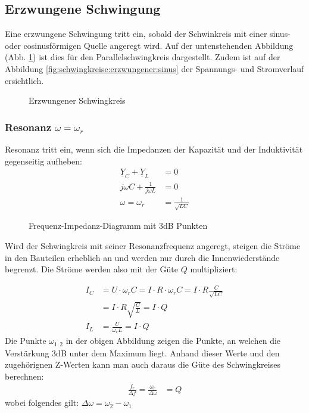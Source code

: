 \subsection{Erzwungene Schwingung}

Eine erzwungene Schwingung tritt ein, sobald der Schwinkreis mit einer sinus-
oder cosinusförmigen Quelle angeregt wird. Auf der untenstehenden Abbildung
(Abb. \ref{fig:schwingkreise:erzwungene}) ist dies für den Parallelschwingkreis
dargestellt. Zudem ist auf der Abbildung
\ref{fig:schwingkreise:erzwungener:sinus} der Spannungs- und Stromverlauf
ersichtlich.

\begin{figure}[!h]
\centering
{}
\qquad
{}
\caption{Erzwungener Schwingkreis}
\label{fig:schwingkreise:erzwungene}
\end{figure}


\subsubsection{Resonanz $\omega = \omega_r$}
Resonanz tritt ein, wenn sich die Impedanzen der Kapazität und der Induktivität
gegenseitig aufheben:
\begin{align}
	\underline{Y}_C +\underline{Y}_L &= 0\nonumber \\
	j\omega C+\frac{1}{j\omega L} &= 0\nonumber \\
	\omega=\omega_r &= \frac{1}{\sqrt{LC}}\nonumber
\end{align}

\begin{figure}[!h]
	\centering
	
	\caption{Frequenz-Impedanz-Diagramm mit 3dB Punkten}
	\label{fig:fZDiagramm}
\end{figure}

Wird der Schwingkreis mit seiner Resonanzfrequenz angeregt, steigen die Ströme
in den Bauteilen erheblich an und werden nur durch die Innenwiederstände
begrenzt. Die Ströme werden also mit der Güte $Q$ multipliziert:

\begin{align}
	I_C&=U\cdot\omega_rC = I\cdot R \cdot \omega_rC = I\cdot R
	\frac{C}{\sqrt{LC}} \nonumber\\
	&=I\cdot R \sqrt{\frac{C}{L}} = I \cdot Q\nonumber\\
	I_L&=\frac{U}{\omega_rL}=I \cdot Q\nonumber
\end{align}
Die Punkte $\omega_{1,2}$ in der obigen Abbildung zeigen die Punkte, an welchen
die Verstärkung 3dB unter dem Maximum liegt. Anhand dieser Werte und den
zugehörignen Z-Werten kann man auch daraus die Güte des Schwingkreises
berechnen:
\begin{align}
	\frac{f_r}{\Delta f}=\frac{\omega_r}{\Delta \omega} &= Q\nonumber
\end{align}
wobei folgendes gilt: $\Delta \omega = \omega_2-\omega_1 $

